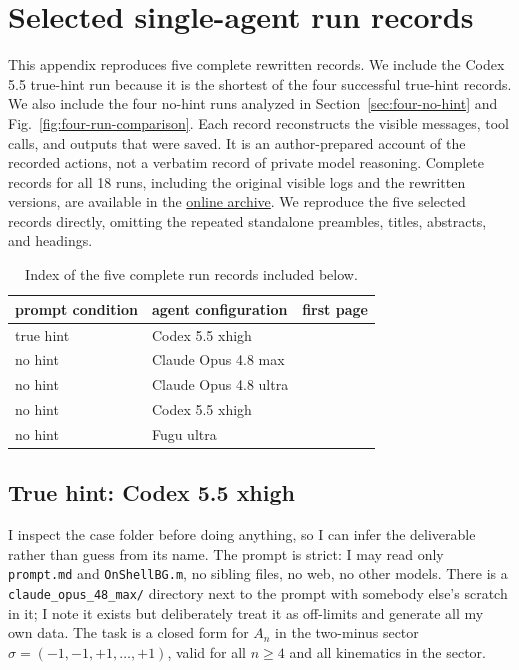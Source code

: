\documentclass{article}
\begin{document}
\clearpage
\section{Selected single-agent run records}
\label{app:thinking-logs}

This appendix reproduces five complete rewritten records. We include the
Codex 5.5 true-hint run because it is the shortest of the four successful
true-hint records. We also include the four no-hint runs analyzed in
Section~\ref{sec:four-no-hint} and Fig.~\ref{fig:four-run-comparison}.
Each record reconstructs the visible messages, tool calls, and outputs that
were saved. It is an author-prepared account of the recorded actions, not a
verbatim record of private model reasoning. Complete records for all 18 runs,
including the original visible logs and the rewritten versions, are available
in the \href{https://github.com/ZihanZhou26/hydrotope_benchmark/blob/main/original_thinking_log_index.md}{online archive}.
We reproduce the five selected records directly, omitting the repeated
standalone preambles, titles, abstracts, and headings.

\begin{table}[H]
\caption{Index of the five complete run records included below.}
\label{tab:thinking-log-index}
\centering
\small
\begin{tabular}{@{}lll@{}}
\toprule
prompt condition & agent configuration & first page \\
\midrule
true hint & Codex 5.5 xhigh       & \pageref{app:log:case2:codex-55} \\
\addlinespace
no hint & Claude Opus 4.8 max   & \pageref{app:log:case3:claude-max} \\
no hint & Claude Opus 4.8 ultra & \pageref{app:log:case3:claude-ultra} \\
no hint & Codex 5.5 xhigh       & \pageref{app:log:case3:codex-55} \\
no hint & Fugu ultra            & \pageref{app:log:case3:fugu} \\
\bottomrule
\end{tabular}
\end{table}

\clearpage
\subsection{True hint: Codex 5.5 xhigh}
\label{app:log:case2:codex-55}

I inspect the case folder before doing anything, so I can infer the deliverable
rather than guess from its name. The prompt is strict: I may read only
\texttt{prompt.md} and \texttt{OnShellBG.m}, no sibling files, no web, no other
models. There is a \texttt{claude\_opus\_48\_max/} directory next to the prompt
with somebody else's scratch in it; I note it exists but deliberately treat it as
off-limits and generate all my own data. The task is a closed form for $A_n$ in
the two-minus sector $\sigma=(-1,-1,+1,\dots,+1)$, valid for all $n\ge4$ and all
kinematics in the sector.
\end{document}
